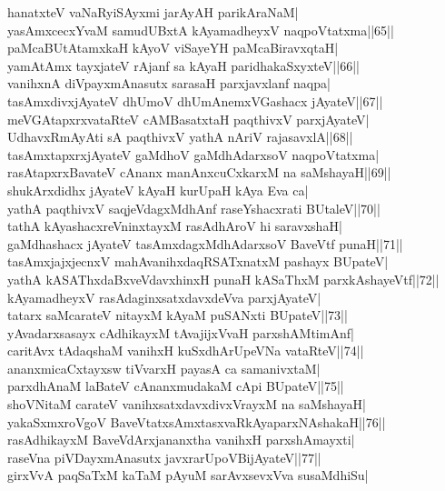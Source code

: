 \documentclass{article}
\begin{document}
hanatxteV vaNaRyiSAyxmi jarAyAH parikAraNaM|\\
yasAmxcecxYvaM samudUBxtA kAyamadheyxV naqpoVtatxma||65||\\
paMcaBUtAtamxkaH kAyoV viSayeYH paMcaBiravxqtaH|\\
yamAtAmx tayxjateV rAjanf sa kAyaH paridhakaSxyxteV||66||\\
vanihxnA diVpayxmAnasutx sarasaH parxjavxlanf naqpa|\\
tasAmxdivxjAyateV dhUmoV dhUmAnemxVGashacx jAyateV||67||\\
meVGAtapxrxvataRteV cAMBasatxtaH paqthivxV parxjAyateV|\\
UdhavxRmAyAti sA paqthivxV yathA nAriV rajasavxlA||68||\\
tasAmxtapxrxjAyateV gaMdhoV gaMdhAdarxsoV naqpoVtatxma|\\
rasAtapxrxBavateV cAnanx manAnxcuCxkarxM na saMshayaH||69||\\
shukArxdidhx jAyateV kAyaH kurUpaH kAya Eva ca|\\
yathA paqthivxV saqjeVdagxMdhAnf raseYshacxrati BUtaleV||70||\\
tathA kAyashacxreVninxtayxM rasAdhAroV hi saravxshaH|\\
gaMdhashacx jAyateV tasAmxdagxMdhAdarxsoV BaveVtf punaH||71||\\
tasAmxjajxjecnxV mahAvanihxdaqRSATxnatxM pashayx BUpateV|\\
yathA kASAThxdaBxveVdavxhinxH punaH kASaThxM parxkAshayeVtf||72||\\
kAyamadheyxV rasAdaginxsatxdavxdeVva parxjAyateV|\\
tatarx saMcarateV nitayxM kAyaM puSANxti BUpateV||73||\\
yAvadarxsasayx cAdhikayxM tAvajijxVvaH parxshAMtimAnf|\\
caritAvx tAdaqshaM vanihxH kuSxdhArUpeVNa vataRteV||74||\\
ananxmicaCxtayxsw tiVvarxH payasA ca samanivxtaM|\\
parxdhAnaM laBateV cAnanxmudakaM cApi BUpateV||75||\\
shoVNitaM carateV vanihxsatxdavxdivxVrayxM na saMshayaH|\\
yakaSxmxroVgoV BaveVtatxsAmxtasxvaRkAyaparxNAshakaH||76||\\
rasAdhikayxM BaveVdArxjananxtha vanihxH parxshAmayxti|\\
raseVna piVDayxmAnasutx javxrarUpoVBijAyateV||77||\\
girxVvA paqSaTxM kaTaM pAyuM sarAvxsevxVva susaMdhiSu|\\
\end{document}
